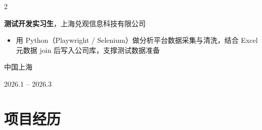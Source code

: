 \documentclass[10pt, a4paper]{article}
\newenvironment{highlights}{
    \begin{itemize}[
        topsep=0.10cm, parsep=0.10cm,
        partopsep=0pt, itemsep=0pt,
        leftmargin=0.4cm + 10pt
    ]
}{
    \end{itemize}
}
\newenvironment{twocolentry}[2][]{
    \onecolentry
    \def\secondColumn{#2}
    \setcolumnwidth{\fill, 4.5cm}
    \begin{paracol}{2}
}{
    \switchcolumn \raggedleft \secondColumn
    \end{paracol}
    \endonecolentry
}
\newcommand{\cvtitle}[1]{%
    {\fontsize{10.5pt}{12pt}\selectfont #1\par}%
    \vspace{0.02cm}%
}
\begin{document}
    \begin{twocolentry}{
        中国上海

        2026.1 – 2026.3
    }
        \cvtitle{\textbf{测试开发实习生}，上海兑观信息科技有限公司}
        \begin{highlights}
            \item 用 Python（Playwright / Selenium）做分析平台数据采集与清洗，结合 Excel 元数据 join 后写入公司库，支撑测试数据准备
        \end{highlights}
    \end{twocolentry}


\section{项目经历}
\end{document}
